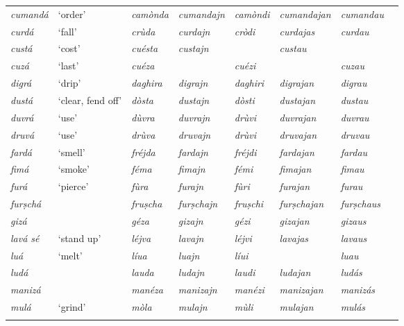 \begin{sidewaystable}
\begin{tabularx}{\textwidth}{llllllll}
		\textit{cumandá} & ‘order’ & \textit{camònda} & \textit{cumandajn} & \textit{camòndi} & \textit{cumandajan} & \textit{cumandau}& \\ 
		\textit{curdá} & ‘fall’ & \textit{crùda} & \textit{curdajn} & \textit{cròdi} & \textit{curdajas} & \textit{curdau}& \\
		\textit{custá} & `cost' & \textit{cuésta} & \textit{custajn} & & \textit{custau} \\
		\textit{cuzá} & ‘last’ & \textit{cuéza} & & \textit{cuézi} & & \textit{cuzau}& \\ 
		\textit{digrá} & ‘drip’ & \textit{daghira} & \textit{digrajn} & \textit{daghiri} & \textit{digrajan} & \textit{digrau}& \\ 
		\textit{dustá} & `clear, fend off' & \textit{dòsta} & \textit{dustajn} & \textit{dòsti} & \textit{dustajan} & \textit{dustau}& \\
		\textit{duvrá} & ‘use’ & \textit{dùvra} & \textit{duvrajn} & \textit{drùvi} & \textit{duvrajan} & \textit{duvrau}& \\ 
		\textit{druvá} & `use' & \textit{drùva} & \textit{druvajn} & \textit{drùvi} & \textit{druvajan} & \textit{druvau}& \\ 
		\textit{fardá} & `smell' & \textit{fréjda} & \textit{fardajn} & \textit{fréjdi} & \textit{fardajan} & \textit{fardau}& \\
		\textit{fimá} & `smoke' & \textit{féma} & \textit{fimajn} & \textit{fémi} & \textit{fimajan} & \textit{fimau}& \\ 
		\textit{furá} & ‘pierce’ & \textit{fùra} & \textit{furajn} & \textit{fùri} & \textit{furajan} & \textit{furau}& \\ 
		\textit{furṣchá} & & \textit{fruṣcha} & \textit{furṣchajn} & \textit{fruṣchi} & \textit{furṣchajan} & \textit{furṣchaus}& \\
		\textit{gizá} & & \textit{géza} & \textit{gizajn} & \textit{gézi} & \textit{gizajan} & \textit{gizaus}& \\
		\textit{lavá sé} & `stand up' & \textit{léjva} & \textit{lavajn} & \textit{léjvi} & \textit{lavajas} & \textit{lavaus} & \\
		\textit{luá} & `melt' & \textit{líua} & \textit{luajn} & \textit{líui} & \textit{}  & \textit{luau}& \\ %
		\textit{ludá} & & \textit{lauda} & \textit{ludajn} & \textit{laudi} & \textit{ludajan} & \textit{ludás}& \\
		\textit{manizá} & & \textit{manéza} & \textit{manizajn} & \textit{manézi} & \textit{manizajan} & \textit{manizás}& \\
		\textit{mulá} & `grind' & \textit{mòla} & \textit{mulajn} &  \textit{mùli} & \textit{mulajan} & \textit{mulás}& \\
		
				\lspbottomrule& 
			\end{tabularx} 
\end{sidewaystable}



